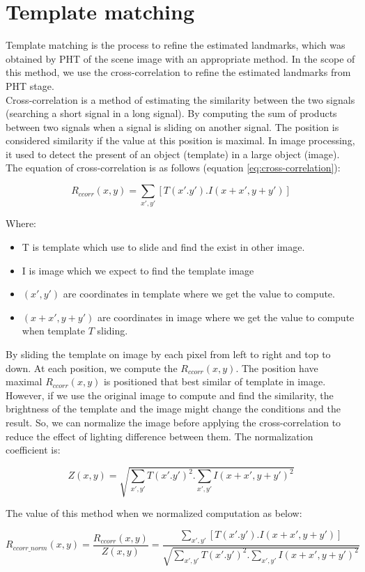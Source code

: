 \section{Template matching}
Template matching is the process to refine the estimated landmarks, which was obtained by PHT of the scene image with an appropriate method. In the scope of this method, we use the cross-correlation to refine the estimated landmarks from PHT stage.\\[0.2cm]
Cross-correlation is a method of estimating the similarity between the two signals (searching a short signal in a long signal). By computing the sum of products between two signals when a signal is sliding on another signal. The position is considered similarity if the value at this position is maximal. In image processing, it used to detect the present of an object (template) in a large object (image). The equation of cross-correlation is as follows (equation \ref{eq:cross-correlation}):
\begin{center}
\begin{equation}\label{eq:cross-correlation}
R_{ccorr}(x,y) = \sum\limits_{x',y'}[T(x'.y').I(x + x', y + y')]
\end{equation}
\end{center}
Where:
\begin{itemize}
\item T is template which use to slide and find the exist in other image.
\item I is image which we expect to find the template image
\item $(x', y')$ are coordinates in template where we get the value to compute.
\item $(x + x', y + y')$ are coordinates in image where we get the value to compute when template $T$ sliding.
\end{itemize}
By sliding the template on image by each pixel from left to right and top to down. At each position, we compute the $R_{ccorr}(x,y)$. The position have maximal $R_{ccorr}(x,y)$ is positioned that best similar of template in image.\\[0.2cm]
However, if we use the original image to compute and find the similarity, the brightness of the template and the image might change the conditions and the result. So, we can normalize the image before applying the cross-correlation to reduce the effect of lighting difference between them. The normalization coefficient is:
\begin{center}
\begin{equation}\label{eq:normalizeCoff}
Z(x,y) = \sqrt{\sum\limits_{x',y'}T(x'.y')^{2}.\sum\limits_{x',y'}I(x + x', y + y')^{2}}
\end{equation}
\end{center}
The value of this method when we normalized computation as below:
\begin{center}
\begin{equation}\label{eq:cross-correlation}
R_{ccorr\_norm}(x,y) =\frac{R_{ccorr}(x,y)}{Z(x,y)} = \frac{\sum\limits_{x',y'}[T(x'.y').I(x + x', y + y')]}{\sqrt{\sum\limits_{x',y'}T(x'.y')^{2}.\sum\limits_{x',y'}I(x + x', y + y')^{2}}}
\end{equation}
\end{center}

